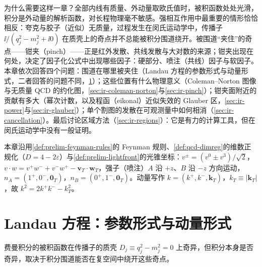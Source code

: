 为什么需要这样一章？全部内线有质量、外动量取欧氏值时，被积函数处处光滑，积分是外动量的解析函数，对长程物理毫不敏感。强相互作用中最重要的情形恰恰相反：夸克与胶子（近似）无质量，过程发生在闵氏运动学中，传播子 $\ii/(q_j^2-m_j^2+\ii0)$ 在质壳上的奇点并不总能被积分围道绕开。被围道“夹住”的奇点——钳夹（pinch）——正是红外发散、共线发散与大对数的来源；钳夹出现在何处，决定了因子化公式中出现哪些因子：硬部分、喷注（共线）因子与软因子。本章依次回答四个问题：围道在哪里被夹住（Landau 方程的参数形式与动量形式，二者回答的问题不同，\cref{sec:ir-landau}）；这些位置有什么物理意义（Coleman--Norton 图像与无质量 QCD 的约化图，\cref{sec:ir-coleman-norton}与\cref{sec:ir-pinch}）；钳夹面附近的贡献有多大（幂次计数，以及程函（eikonal）近似失效的 Glauber 区，\cref{sec:ir-power}与\cref{sec:ir-glauber}）；单个割图的发散在可观测量中如何相消（\cref{sec:ir-cancellation}）。最后讨论区域方法（\cref{sec:ir-regions}）：它是有力的计算工具，但在闵氏运动学中没有一般证明。

本章沿用\cref{def:prelim-feynman-rules}的 Feynman 规则、\cref{def:qcd-dimreg}的维数正规化（$D=4-2\varepsilon$）与\cref{def:prelim-lightfront}的光锥坐标：$v^\pm=(v^0\pm v^3)/\sqrt2$，$v\cdot w=v^+w^-+v^-w^+-\mathbf v_T\cdot\mathbf w_T$，强子（喷注）$A$ 沿 $+z$、$B$ 沿 $-z$ 方向运动，$n_A=(1^+,0^-,\mathbf 0_T)$，$n_B=(0^+,1^-,\mathbf 0_T)$。动量写作 $k=(k^+,k^-,\mathbf k_T)$，$k_T\equiv|\mathbf k_T|$，故 $k^2=2k^+k^--k_T^2$。
\section{Landau 方程：参数形式与动量形式}\label{sec:ir-landau}

费曼积分的被积函数在传播子的质壳 $D_j\equiv q_j^2-m_j^2=0$ 上奇异，但积分本身是否奇异，取决于积分围道能否在复空间中绕开这些奇点。

